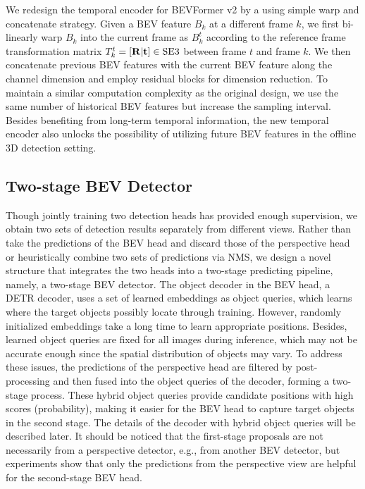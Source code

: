 \documentclass[10pt,twocolumn,letterpaper]{article}
\begin{document}
We redesign the temporal encoder for BEVFormer v2 by a using simple warp and concatenate strategy.
Given a BEV feature $B_k$ at a different frame $k$, we first bi-linearly warp $B_k$ into the current frame as $B_k^t$ according to the reference frame transformation matrix $T_k^{t} = [\bf{R} | \bf{t}] \in \text{SE3}$ between frame $t$ and frame $k$. 
We then concatenate previous BEV features with the current BEV feature along the channel dimension and employ residual blocks for dimension reduction.
To maintain a similar computation complexity as the original design, we use the same number of historical BEV features but increase the sampling interval.
Besides benefiting from long-term temporal information, the new temporal encoder also unlocks the possibility of utilizing future BEV features in the offline 3D detection setting.

\subsection{Two-stage BEV Detector}
Though jointly training two detection heads has provided enough supervision, we obtain two sets of detection results separately from different views. 
Rather than take the predictions of the BEV head and discard those of the perspective head or heuristically combine two sets of predictions via NMS, we design a novel structure that integrates the two heads into a two-stage predicting pipeline, namely, a two-stage BEV detector. 
The object decoder in the BEV head, a DETR \cite{DETR} decoder, uses a set of learned embeddings as object queries, which learns where the target objects possibly locate through training. 
However, randomly initialized embeddings take a long time to learn appropriate positions. 
Besides, learned object queries are fixed for all images during inference, which may not be accurate enough since the spatial distribution of objects may vary. 
To address these issues, the predictions of the perspective head are filtered by post-processing and then fused into the object queries of the decoder, forming a two-stage process. 
These hybrid object queries provide candidate positions with high scores (probability), making it easier for the BEV head to capture target objects in the second stage. The details of the decoder with hybrid object queries will be described later. 
It should be noticed that the first-stage proposals are not necessarily from a perspective detector, e.g., from another BEV detector, but experiments show that only the predictions from the perspective view are helpful for the second-stage BEV head. 
\end{document}
